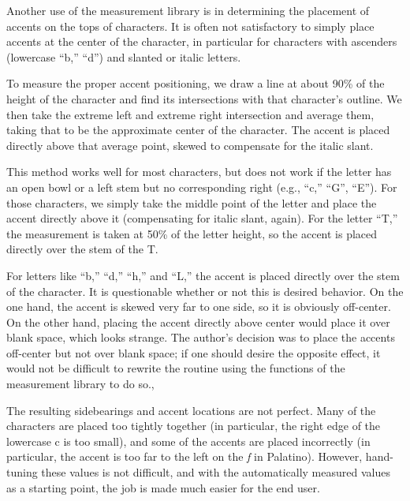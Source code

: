 
Another use of the measurement library is in determining the placement of
accents on the tops of characters. It is often not satisfactory to simply place
accents at the center of the character, in particular for characters with
ascenders (lowercase ``b,'' ``d'') and slanted or italic letters.

To measure the proper accent positioning, we draw a line at about 90\% of the
height of the character and find its intersections with that character's
outline. We then take the extreme left and extreme right intersection and
average them, taking that to be the approximate center of the character. The
accent is placed directly above that average point, skewed to compensate for the
italic slant.

This method works well for most characters, but does not work if the letter has
an open bowl or a left stem but no corresponding right (e.g., ``c,'' ``G'',
``E''). For those characters, we simply take the middle point of the letter and
place the accent directly above it (compensating for italic slant, again). For
the letter ``T,'' the measurement is taken at 50\% of the letter height, so the
accent is placed directly over the stem of the T.

For letters like ``b,'' ``d,'' ``h,'' and ``L,'' the accent is placed directly
over the stem of the character. It is questionable whether or not this is
desired behavior. On the one hand, the accent is skewed very far to one side, so
it is obviously off-center. On the other hand, placing the accent directly above
center would place it over blank space, which looks strange. The author's
decision was to place the accents off-center but not over blank space; if one
should desire the opposite effect, it would not be difficult to rewrite the
routine using the functions of the measurement library to do so.,

\linespace

The resulting sidebearings and accent locations are not perfect. Many of the
characters are placed too tightly together (in particular, the right edge of the
lowercase c is too small), and some of the accents are placed incorrectly (in
particular, the accent is too far to the left on the \emph{f} in Palatino).
However, hand-tuning these values is not difficult, and with the automatically
measured values as a starting point, the job is made much easier for the end
user.

